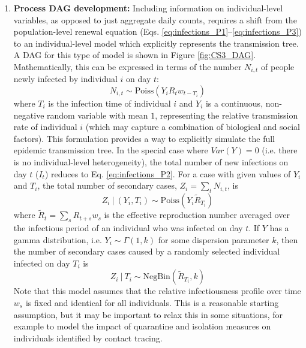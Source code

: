 \documentclass{article}
\begin{document}
\begin{enumerate}
    \item \textbf{Process DAG development:} Including information on individual-level variables, as opposed to just aggregate daily counts, requires a shift from the population-level renewal equation (Eqs. \eqref{eq:infections_P1}--\eqref{eq:infections_P3}) to an individual-level model which explicitly represents the transmission tree. A DAG for this type of model is shown in Figure \ref{fig:CS3_DAG}. Mathematically, this can be expressed in terms of the number $N_{i,t}$ of people newly infected by individual $i$ on day $t$:
    \begin{equation} \label{eq:individual_level}
    N_{i,t} \sim \mathrm{Poiss} \left( Y_i R_t w_{t-T_i} \right)
    \end{equation}
    where $T_i$ is the infection time of individual $i$ and $Y_i$ is a continuous, non-negative random variable with mean $1$, representing the relative transmission rate of individual $i$ (which may capture a combination of biological and social factors). This formulation provides a way to explicitly simulate the full epidemic transmission tree.  In the special case where $Var(Y)=0$ (i.e. there is no individual-level heterogeneity), the total number of new infections on day $t$ ($I_t$) reduces to Eq. \eqref{eq:infections_P2}.  For a case with given values of $Y_i$ and $T_i$, the total number of secondary cases, $Z_i=\sum_t N_{i,t}$, is
    \begin{equation}
       Z_i \ | \ (Y_i, T_i) \sim \mathrm{Poiss}\left( Y_i \tilde{R}_{T_i}\right)
    \end{equation}
    where $\tilde{R}_t= \sum_s R_{t+s} w_s$ is the effective reproduction number averaged over the infectious period of an individual who was infected on day $t$. If $Y$ has a gamma distribution, i.e. $Y_i\sim \Gamma(1,k)$ for some dispersion parameter $k$, then the number of secondary cases caused by a randomly selected individual infected on day $T_i$ is \citep{lloyd2005superspreading}
     \begin{equation} \label{eq:offspring_dist}
        Z_i \ | \ T_i \sim \mathrm{NegBin}\left( \tilde{R}_{T_i}, k\right)
    \end{equation}   
    Note that this model assumes that the relative infectiousness profile over time $w_s$ is fixed and identical for all individuals. This is a reasonable starting assumption, but it may be important to relax this in some situations, for example to model the impact of quarantine and isolation measures on individuals identified by contact tracing.

\end{enumerate}
\end{document}
